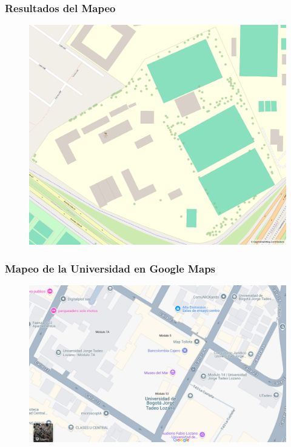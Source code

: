 \documentclass[17pt, t, lualatex]{beamer}
\begin{document}
\begin{frame}
  \frametitle{Resultados del Mapeo }
  \begin{figure}
    \centering
    \includegraphics[height=0.95\textheight]{img/ITI.png}
  \end{figure}
\end{frame}

\begin{frame}
  \frametitle{Mapeo de la Universidad en Google Maps }
  \begin{figure}
    \centering
    \includegraphics[height=0.95\textheight]{img/Google.png}
  \end{figure}
\end{frame}
\end{document}

